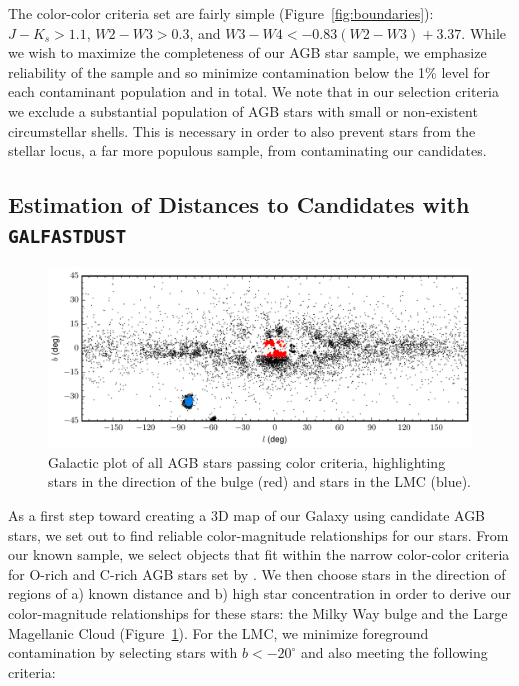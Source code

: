 The color-color criteria set are fairly simple (Figure~\ref{fig:boundaries}): $J-K_s > 1.1$, $W2-W3 > 0.3$, and $W3-W4 < -0.83(W2-W3) + 3.37$. While we wish to maximize the completeness of our AGB star sample, we emphasize reliability of the sample and so minimize contamination below the 1\% level for each contaminant population and in total. We note that in our selection criteria we exclude a substantial population of AGB stars with small or non-existent circumstellar shells. This is necessary in order to also prevent stars from the stellar locus, a far more populous sample, from contaminating our candidates.

\subsection{Estimation of Distances to Candidates with {\tt GALFASTDUST}}
\begin{figure}[h]
\centering
\includegraphics[width=6in]{figs/bulge_lmc_galcoords.pdf}
\caption{{\footnotesize Galactic plot of all AGB stars passing color criteria, highlighting stars in the direction of the bulge (red) and stars in the LMC (blue).}}
\label{fig:galplot}
\end{figure}

As a first step toward creating a 3D map of our Galaxy using candidate AGB stars, we set out to find reliable color-magnitude relationships for our stars. From our known sample, we select objects that fit within the narrow color-color criteria for O-rich and C-rich AGB stars set by \cite{2014MNRAS.442.3361N}. We then choose stars in the direction of regions of a) known distance and b) high star concentration in order to derive our color-magnitude relationships for these stars: the Milky Way bulge and the Large Magellanic Cloud (Figure~\ref{fig:galplot}). For the LMC, we minimize foreground contamination by selecting stars with $b < -20^\circ$ and also meeting the following criteria:

